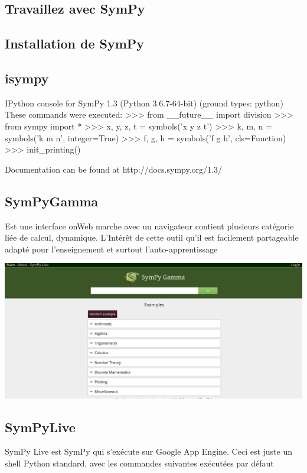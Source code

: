 \subsection{Travaillez avec SymPy}
\subsection{Installation de SymPy}

\subsection{isympy}
  \begin{python}
IPython console for SymPy 1.3 (Python 3.6.7-64-bit) (ground types: python)
These commands were executed:
>>> from __future__ import division
>>> from sympy import *
>>> x, y, z, t = symbols('x y z t')
>>> k, m, n = symbols('k m n', integer=True)
>>> f, g, h = symbols('f g h', cls=Function)
>>> init_printing()

Documentation can be found at http://docs.sympy.org/1.3/

  \end{python}
\subsection{SymPyGamma}
Est une interface onWeb marche avec un navigateur contient plusieurs catégorie liée de calcul, dynamique. L’Intérêt de cette outil qu'il est facilement partageable adapté pour l’enseignement et surtout l'auto-apprentissage

\includegraphics[scale=0.3]{../Pictures/sympyGammaMain.png} 

\subsection{SymPyLive}
SymPy Live est SymPy qui s'exécute sur Google App Engine. Ceci est juste un shell Python standard, avec les commandes suivantes exécutées par défaut
